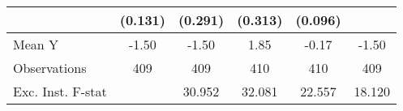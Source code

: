 {\begin{tabular}{l*{5}{c}}
            &     (0.131)         &     (0.291)         &     (0.313)         &     (0.096)         &                     \\
\midrule
Mean Y      &       -1.50         &       -1.50         &        1.85         &       -0.17         &       -1.50         \\
Observations&         409         &         409         &         410         &         410         &         409         \\
Exc. Inst. F-stat&                     &      30.952         &      32.081         &      22.557         &      18.120         \\
\bottomrule
\end{tabular}
}
